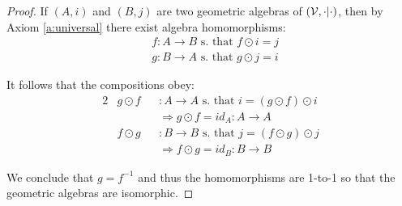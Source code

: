 \begin{proof}
	If $(A, i)$ and $(B, j)$ are two geometric algebras of $(\mathcal{V}, \cdot|\cdot)$, then by Axiom \ref{a:universal} there exist algebra homomorphisms:
	\begin{align*}
		&f: A \to B \text{ s. that } f \odot i = j \\
		&g: B \to A \text{ s. that } g \odot j = i
	\end{align*}

	It follows that the compositions obey:
	\begin{alignat*}{2}
		&g \odot f&&: A \to A \text{ s. that } i = (g \odot f) \odot i \\
		& &&\Rightarrow g \odot f = id_A : A \to A \\
		&f \odot g&&: B \to B \text{ s. that } j = (f \odot g) \odot j \\
		& &&\Rightarrow f \odot g = id_B : B \to B
	\end{alignat*}

	We conclude that $g = f^{-1}$ and thus the homomorphisms are 1-to-1 so that the geometric algebras are isomorphic.
\end{proof}

